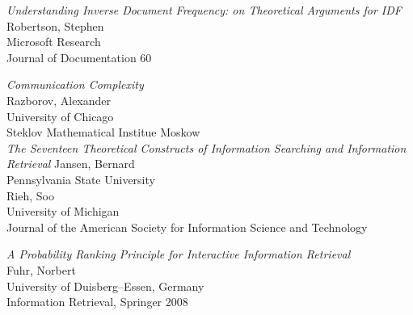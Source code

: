 \documentclass{article}
\begin{document}
\begin{thebibliography}{99}

        {\it Understanding Inverse Document Frequency:
            on Theoretical Arguments for IDF} \\
        Robertson, Stephen \\
        Microsoft Research \\
        Journal of Documentation 60

        {\it Communication Complexity} \\
        Razborov, Alexander \\
        University of Chicago \\
        Steklov Mathematical Institue Moskow \\

        {\it The Seventeen Theoretical Constructs of Information
            Searching and Information Retrieval}
        Jansen, Bernard \\
        Pennsylvania State University \\
        Rieh, Soo \\
        University of Michigan \\
        Journal of the American Society for 
        Information Science and Technology

        {\it A Probability Ranking Principle for
            Interactive Information Retrieval} \\
        Fuhr, Norbert \\
        University of Duisberg--Essen, Germany \\
        Information Retrieval, Springer 2008



\end{thebibliography}
\end{document}
